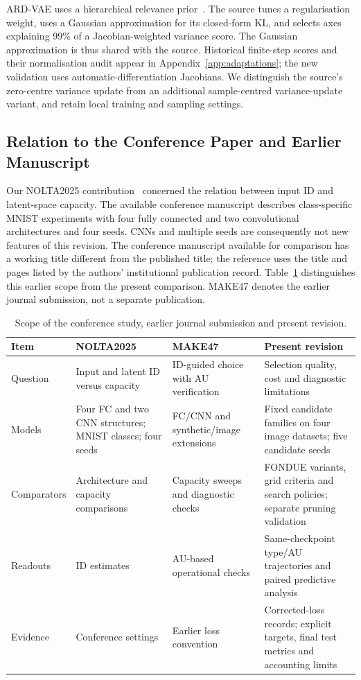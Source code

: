 \documentclass[make,article,submit,pdftex,moreauthors]{Definitions/mdpi}
\begin{document}
ARD-VAE uses a hierarchical relevance prior~\cite{saha2025ardvae}.
The source tunes a regularisation weight, uses a Gaussian approximation
for its closed-form KL, and selects axes explaining 99\% of a
Jacobian-weighted variance score. The Gaussian approximation is thus
shared with the source. Historical finite-step scores and their
normalisation audit appear in Appendix~\ref{app:adaptations}; the new
validation uses automatic-differentiation Jacobians. We distinguish the
source's zero-centre variance update from an additional sample-centred
variance-update variant, and retain local training and sampling settings.

\subsection{Relation to the Conference Paper and Earlier Manuscript}
Our NOLTA2025 contribution~\cite{obata2025manifold} concerned the relation
between input ID and latent-space capacity. The available conference
manuscript describes class-specific MNIST experiments with four fully
connected and two convolutional architectures and four seeds. CNNs and
multiple seeds are consequently not new features of this revision.
The conference manuscript available for comparison has a working title
different from the published title; the reference uses the title and
pages listed by the authors' institutional publication record.
Table~\ref{tab:history} distinguishes this earlier scope from the present
comparison. MAKE47 denotes the earlier journal submission, not a separate
publication.

\begin{table}[H]
\caption{Scope of the conference study, earlier journal submission and present revision.}
\label{tab:history}\small
\begin{tabularx}{\textwidth}{lXXX}\toprule
Item & NOLTA2025 & MAKE47 & Present revision \\\midrule
Question & Input and latent ID versus capacity & ID-guided choice with AU verification & Selection quality, cost and diagnostic limitations \\
Models & Four FC and two CNN structures; MNIST classes; four seeds & FC/CNN and synthetic/image extensions & Fixed candidate families on four image datasets; five candidate seeds \\
Comparators & Architecture and capacity comparisons & Capacity sweeps and diagnostic checks & FONDUE variants, grid criteria and search policies; separate pruning validation \\
Readouts & ID estimates & AU-based operational checks & Same-checkpoint type/AU trajectories and paired predictive analysis \\
Evidence & Conference settings & Earlier loss convention & Corrected-loss records; explicit targets, final test metrics and accounting limits \\
\bottomrule\end{tabularx}
\end{table}
\end{document}
